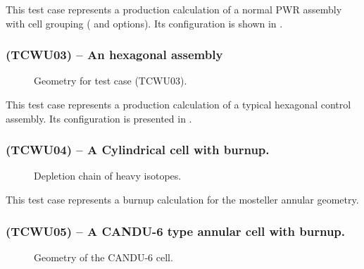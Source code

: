This test case represents a production calculation of a normal PWR assembly
with cell grouping ( and  options). Its configuration is
shown in .


\subsubsection{\tst(TCWU03) -- An hexagonal assembly}

\begin{figure}[h!]  
\begin{center} 
\epsfxsize=11cm \centerline{ }
\parbox{14cm}{\caption{Geometry for test case \tst(TCWU03).}\label{fig:TCWU03}}   
\end{center}   \end{figure}

This test case represents a production calculation of a
typical hexagonal control assembly. Its configuration is presented in
.
                                                            

\subsubsection{\tst(TCWU04) -- A Cylindrical cell with burnup.}

\begin{figure}[h!]  
\begin{center} 
\epsfxsize=15cm \centerline{ }
\parbox{14cm}{\caption{Depletion chain of heavy
 isotopes.}\label{fig:TCA04}}    \end{center}   \end{figure}

This test case represents a burnup calculation for the mosteller annular
geometry.


\subsubsection{\tst(TCWU05) -- A CANDU-6 type annular cell with burnup.}

\begin{figure}[h!]  
\begin{center} 
\epsfxsize=9cm \centerline{ }
\parbox{14cm}{\caption{Geometry of the CANDU-6 cell.}\label{fig:TCWU05}}   
\end{center}  
\end{figure}

